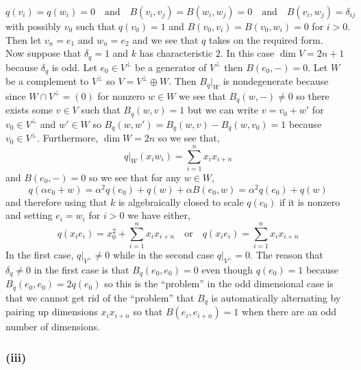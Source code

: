 \documentclass[12pt]{article}
\begin{document}
\[ q(v_i) = q(w_i) = 0 \quad \text{and} \quad B(v_i, v_j) = B(w_i, w_j) = 0 \quad \text{and} \quad B(v_i, w_j) = \delta_{ij} \]
with possibly $v_0$ such that $q(v_0) = 1$ and $B(v_0, v_i) = B(v_0, w_i) = 0$ for $i > 0$. Then let $v_n = e_1$ and $w_n = e_2$ and we see that $q$ takes on the required form. 
\bigskip\\
Now suppose that $\delta_q = 1$ and $k$ has characteristic $2$. In this case $\dim{V} = 2n + 1$ because $\delta_q$ is odd. Let $e_0 \in V^\perp$ be a generator of $V^\perp$ then $B(e_0, -) = 0$. Let $W$ be a complement to $V^\perp$ so $V = V^\perp \oplus W$. Then $B_q |_W$ is nondegenerate because since $W \cap V^\perp = (0)$ for nonzero $w \in W$ we see that $B_q(w, -) \neq 0$ so there exists some $v \in V$ such that $B_q(w, v) = 1$ but we can write $v = v_0 + w'$ for $v_0 \in V^\perp$ and $w' \in W$ so $B_q(w, w') = B_q(w, v) - B_q(w, v_0) = 1$ because $v_0 \in V^\perp$. Furthermore, $\dim{W} = 2n$ so we see that,
\[ q|_W(x_i w_i) = \sum_{i = 1}^n x_i x_{i + n} \]
and $B(e_0, -) = 0$ so we see that for any $w \in W$,
\[ q(\alpha e_0 + w) = \alpha^2 q(e_0) + q(w) + \alpha B(e_0, w) = \alpha^2 q(e_0) + q(w) \]
and therefore using that $k$ is algebraically closed to scale $q(e_0)$ if it is nonzero and setting $e_i = w_i$ for $i > 0$ we have either,
\[ q(x_i e_i) = x_0^2 + \sum_{i = 1}^n x_i x_{i+n} \quad \text{or} \quad q(x_i e_i) = \sum_{i = 1}^n x_i x_{i + n} \]
In the first case, $q|_{V^\perp} \neq 0$ while in the second case $q|_{V^\perp} = 0$. The reason that $\delta_q \neq 0$ in the first case is that $B_q(e_0, e_0) = 0$ even though $q(e_0) = 1$ because $B_q(e_0, e_0) = 2 q(e_0)$ so this is the ``problem'' in the odd dimensional case is that we cannot get rid of the ``problem'' that $B_q$ is automatically alternating by pairing up dimensions $x_i x_{i+n}$ so that $B(e_i, e_{i+n}) = 1$ when there are an odd number of dimensions.

\subsubsection{(iii)}
\end{document}
